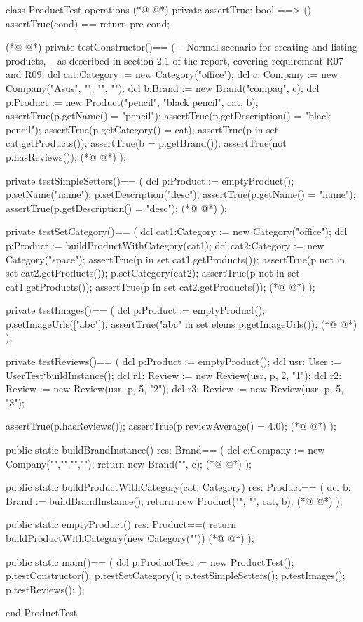 \begin{vdmpp}[breaklines=true]
class ProductTest
 operations
(*@
\label{assertTrue:3}
@*)
  private assertTrue: bool ==> ()
    assertTrue(cond) == return
    pre cond;
    
(*@
\label{testConstructor:7}
@*)
  private testConstructor()==
  (
    -- Normal scenario for creating and listing products,
     -- as described in section 2.1 of the report, covering requirement R07 and R09.
   dcl cat:Category := new Category("office");
   dcl c: Company := new Company("Asus", "", "", "");
   dcl b:Brand := new Brand("compaq", c);
   dcl p:Product := new Product("pencil", "black pencil", cat, b);
   assertTrue(p.getName() = "pencil");
   assertTrue(p.getDescription() = "black pencil");
   assertTrue(p.getCategory() = cat);
   assertTrue(p in set cat.getProducts());
   assertTrue(b = p.getBrand());
   assertTrue(not p.hasReviews());
(*@
\label{testSimpleSetters:21}
@*)
  );
  
  private testSimpleSetters()==
  (
   dcl p:Product := emptyProduct();
   p.setName("name");
   p.setDescription("desc");
   assertTrue(p.getName() = "name");
   assertTrue(p.getDescription() = "desc");
(*@
\label{testSetCategory:30}
@*)
  );
  
  private testSetCategory()==
  (
   dcl cat1:Category := new Category("office");
   dcl p:Product := buildProductWithCategory(cat1);
   dcl cat2:Category := new Category("space");
   assertTrue(p in set cat1.getProducts());
   assertTrue(p not in set cat2.getProducts());
   p.setCategory(cat2);
   assertTrue(p not in set cat1.getProducts());
   assertTrue(p in set cat2.getProducts());
(*@
\label{testImages:42}
@*)
  );
  
  private testImages()==
  (
   dcl p:Product := emptyProduct();
   p.setImageUrls(["abc"]);
   assertTrue("abc" in set elems p.getImageUrls());
(*@
\label{testReviews:49}
@*)
  );
  
  private testReviews()==
  (
   dcl p:Product := emptyProduct();
   dcl usr: User := UserTest`buildInstance();
   dcl r1: Review := new Review(usr, p, 2, "1");
   dcl r2: Review := new Review(usr, p, 5, "2");
   dcl r3: Review := new Review(usr, p, 5, "3");
   
   assertTrue(p.hasReviews());
   assertTrue(p.reviewAverage() = 4.0);
(*@
\label{buildBrandInstance:61}
@*)
  );
  
  public static buildBrandInstance() res: Brand==
  (
   dcl c:Company := new Company("","","","");
   return new Brand("", c);
(*@
\label{buildProductWithCategory:67}
@*)
  );
  
  public static buildProductWithCategory(cat: Category) res: Product==
  (
   dcl b: Brand := buildBrandInstance();
   return new Product("", "", cat, b);
(*@
\label{emptyProduct:73}
@*)
  );
  
  public static emptyProduct() res: Product==(
   return buildProductWithCategory(new Category(""))
(*@
\label{main:77}
@*)
  ); 
  
  public static main()==
    (
   dcl p:ProductTest := new ProductTest();
   p.testConstructor();
   p.testSetCategory();
   p.testSimpleSetters();
   p.testImages();
   p.testReviews();
    );
     
end ProductTest
\end{vdmpp}
